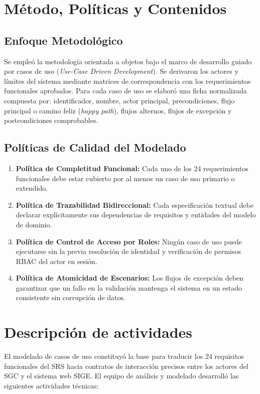 \documentclass[12pt,a4paper]{article}
\begin{document}
\section{Método, Políticas y Contenidos}
\subsection{Enfoque Metodológico}
Se empleó la metodología orientada a objetos bajo el marco de desarrollo guiado por casos de uso (\textit{Use-Case Driven Development}). Se derivaron los actores y límites del sistema mediante matrices de correspondencia con los requerimientos funcionales aprobados. Para cada caso de uso se elaboró una ficha normalizada compuesta por: identificador, nombre, actor principal, precondiciones, flujo principal o camino feliz (\textit{happy path}), flujos alternos, flujos de excepción y postcondiciones comprobables.

\subsection{Políticas de Calidad del Modelado}
\begin{enumerate}[leftmargin=1.5em, itemsep=2pt]
    \item \textbf{Política de Completitud Funcional:} Cada uno de los 24 requerimientos funcionales debe estar cubierto por al menos un caso de uso primario o extendido.
    \item \textbf{Política de Trazabilidad Bidireccional:} Cada especificación textual debe declarar explícitamente sus dependencias de requisitos y entidades del modelo de dominio.
    \item \textbf{Política de Control de Acceso por Roles:} Ningún caso de uso puede ejecutarse sin la previa resolución de identidad y verificación de permisos RBAC del actor en sesión.
    \item \textbf{Política de Atomicidad de Escenarios:} Los flujos de excepción deben garantizar que un fallo en la validación mantenga el sistema en un estado consistente sin corrupción de datos.
\end{enumerate}

\section{Descripción de actividades}
El modelado de casos de uso constituyó la base para traducir los 24 requisitos funcionales del SRS hacia contratos de interacción precisos entre los actores del SGC y el sistema web SIGE. El equipo de análisis y modelado desarrolló las siguientes actividades técnicas:
\end{document}
